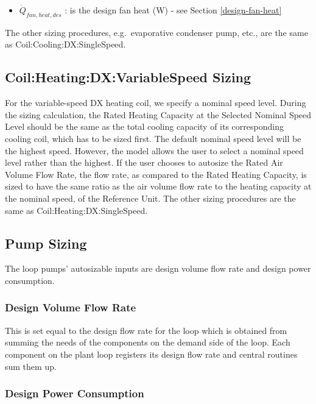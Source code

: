\begin{itemize}
\item
  \(\dot{Q}_{fan,heat,des}\) : is the design fan heat (W) - see Section \ref{design-fan-heat}
\end{itemize}


The other sizing procedures, e.g.~evaporative condenser pump, etc., are the same as Coil:Cooling:DX:SingleSpeed.

\subsection{Coil:Heating:DX:VariableSpeed Sizing}\label{coilheatingdxvariablespeed-sizing}

For the variable-speed DX heating coil, we specify a nominal speed level. During the sizing calculation, the Rated Heating Capacity at the Selected Nominal Speed Level should be the same as the total cooling capacity of its corresponding cooling coil, which has to be sized first. The default nominal speed level will be the highest speed. However, the model allows the user to select a nominal speed level rather than the highest. If the user chooses to autosize the Rated Air Volume Flow Rate, the flow rate, as compared to the Rated Heating Capacity, is sized to have the same ratio as the air volume flow rate to the heating capacity at the nominal speed, of the Reference Unit. The other sizing procedures are the same as Coil:Heating:DX:SingleSpeed.

\subsection{Pump Sizing}\label{pump-sizing}

The loop pumps' autosizable inputs are design volume flow rate and design power consumption.

\subsubsection{Design Volume Flow Rate}\label{design-volume-flow-rate}

This is set equal to the design flow rate for the loop which is obtained from summing the needs of the components on the demand side of the loop. Each component on the plant loop registers its design flow rate and central routines sum them up.

\subsubsection{Design Power Consumption}\label{design-power-consumption}

